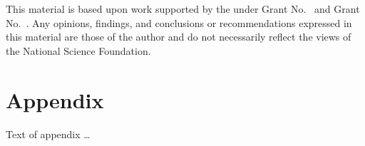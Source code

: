 \documentclass[sigplan,review,anonymous]{acmart}\settopmatter{printfolios=true,printccs=false,printacmref=false}
\theoremstyle{acmplain}
\theoremstyle{acmdefinition}
\begin{document}
\begin{acks}                            %
  This material is based upon work supported by the
   under Grant
  No.~ and Grant
  No.~.  Any opinions, findings, and
  conclusions or recommendations expressed in this material are those
  of the author and do not necessarily reflect the views of the
  National Science Foundation.
\end{acks}


%


\appendix
\section{Appendix}

Text of appendix \ldots
\end{document}
